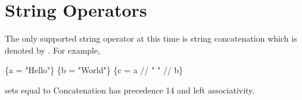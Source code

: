 \section{String Operators}

The only supported string operator at this time is string concatenation which is 
denoted by \cmd{//}. For example,
\begin{apinp}
\{a = "Hello"\} \{b = "World"\}
\{c = a // " " //  b\}
\end{apinp}
sets  equal to   Concatenation 
has precedence 14 and left associativity.
